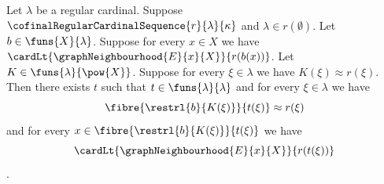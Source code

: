 \begin{theorem}\label{uniform_block_index_map_exists}
    Let $\lambda$ be a regular cardinal.
    Suppose $\cofinalRegularCardinalSequence{r}{\lambda}{\kappa}$ and
        $\lambda\in r(\emptyset)$.
    Let $b\in\funs{X}{\lambda}$.
    Suppose for every $x\in X$ we have
        $\cardLt{\graphNeighbourhood{E}{x}{X}}{r(b(x))}$.
    Let $K\in\funs{\lambda}{\pow{X}}$.
    Suppose for every $\xi\in\lambda$ we have $K(\xi)\approx r(\xi)$.
    Then there exists $t$ such that $t\in\funs{\lambda}{\lambda}$ and
        for every $\xi\in\lambda$ we have
        \[
            \fibre{\restrl{b}{K(\xi)}}{t(\xi)}\approx r(\xi)
        \]
        and for every $x\in\fibre{\restrl{b}{K(\xi)}}{t(\xi)}$ we have
        \[
            \cardLt{\graphNeighbourhood{E}{x}{X}}{r(t(\xi))}
        \].
\end{theorem}
